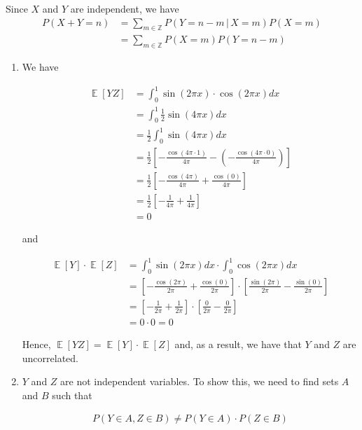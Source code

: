 \documentclass[12pt]{article}
\newenvironment{problem}[2][Problem]{\begin{trivlist}
\item[\hskip \labelsep {\bfseries #1}\hskip \labelsep {\bfseries #2.}]}{\end{trivlist}}
\DeclareMathOperator*{\E}{\mathbb{E}}
\begin{document}
Since $X$ and $Y$ are independent, we have
\begin{align*}
P(X + Y = n) &= \sum_{m \in \mathbb{Z}} P(Y = n - m  \, | \, X = m) P(X = m)\\
&= \sum_{m \in \mathbb{Z}} P(X = m) P(Y = n - m)
\end{align*}
\begin{problem}{4}
\end{problem}

\begin{enumerate}[(\Alph*)]

\item

We have

\begin{align*}
\E[YZ] &= \int_{0}^1 \sin(2\pi x) \cdot \cos(2\pi x) dx\\
&= \int_{0}^1 \frac{1}{2} \sin(4\pi x) dx\\
&= \frac{1}{2} \int_{0}^1 \sin(4\pi x) dx\\
&= \frac{1}{2} \left[ - \frac{\cos(4\pi \cdot 1)}{4 \pi} - \left(- \frac{\cos(4\pi \cdot 0)}{4 \pi}\right)\right]\\
&= \frac{1}{2} \left[ - \frac{\cos(4\pi)}{4 \pi} + \frac{\cos(0)}{4 \pi}\right]\\
&= \frac{1}{2} \left[ - \frac{1}{4 \pi} + \frac{1}{4 \pi}\right]\\
&= 0
\end{align*}

and

\begin{align*}
\E[Y] \cdot \E[Z] &= \int_0^1 \sin(2\pi x) dx \cdot \int_0^1 \cos(2\pi x) dx\\
&= \left[-\frac{\cos(2\pi)}{2\pi} + \frac{\cos(0)}{2\pi}\right] \cdot \left[\frac{\sin(2\pi)}{2\pi} - \frac{\sin(0)}{2\pi}\right]\\
&= \left[-\frac{1}{2\pi} + \frac{1}{2\pi}\right] \cdot \left[\frac{0}{2\pi} - \frac{0}{2\pi}\right]\\
&= 0 \cdot 0 = 0
\end{align*}

Hence, $\E[YZ] = \E[Y] \cdot \E[Z]$ and, as a result, we have that $Y$ and $Z$ are uncorrelated.

\newpage
\item

$Y$ and $Z$ are not independent variables. To show this, we need to find sets $A$ and $B$ such that

\begin{align*}
P(Y \in A, Z \in B) \neq P(Y \in A) \cdot P(Z \in B)
\end{align*}


\end{enumerate}
\end{document}
